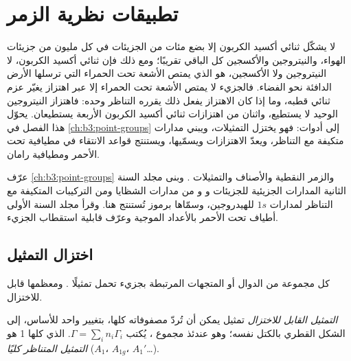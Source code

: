 \chapter{تطبيقات نظرية الزمر}\label{ch:b3:group-theory-applied}

لا يشكّل ثنائي أكسيد الكربون إلا بضع مئات من الجزيئات في كل مليون من جزيئات
الهواء، والنيتروجين والأكسجين كل الباقي تقريبًا؛ ومع ذلك فإن ثنائي أكسيد الكربون، لا
النيتروجين ولا الأكسجين، هو الذي يمتص الأشعة تحت الحمراء التي ترسلها الأرض الدافئة نحو
الفضاء. فالجزيء لا يمتص الأشعة تحت الحمراء إلا عبر اهتزاز
يغيّر عزم ثنائي قطبه، وما إذا كان الاهتزاز يفعل ذلك يقرره
التناظر وحده: فاهتزاز النيتروجين الوحيد لا يستطيع، واثنان من اهتزازات ثنائي أكسيد الكربون
الأربعة يستطيعان. يحوّل هذا الفصل  في
\cref{ch:b3:point-groups} إلى أدوات: فهو يختزل التمثيلات، ويبني
مدارات متكيفة مع التناظر، ويعدّ الاهتزازات ويسمّيها، ويستنتج
قواعد الانتقاء في مطيافية تحت الأحمر ومطيافية رامان.

\begin{recall}
عرّف \cref{ch:b3:point-groups}  والزمر النقطية
والأصناف والتمثيلات  . وبنى مجلد السنة الثانية
المدارات الجزيئية للجزيئات  و و من
مدارات الشظايا ومن التركيبات المتكيفة مع التناظر لمدارات $1s$ للهيدروجين،
وسمّاها برموز تُستنتج هنا. وقرأ مجلد السنة الأولى
أطياف تحت الأحمر بالأعداد الموجية وعرّف قابلية استقطاب
الجزيء.
\end{recall}

\section{اختزال التمثيل}

كل مجموعة من الدوال أو المتجهات المرتبطة بجزيء تحمل
تمثيلًا . ومعظمها قابل للاختزال.

\begin{definition}\label{def:b3:group-theory-applied:reducible}
\emph{التمثيل القابل للاختزال} تمثيل
يمكن أن تُردّ مصفوفاته كلها، بتغيير واحد للأساس، إلى الشكل
القطري بالكتل نفسه؛ وهو عندئذ مجموع ،
يُكتب $\Gamma = \sum_in_i\Gamma_i$.  الذي
 كلها 1 هو \emph{التمثيل المتناظر
كليًا} ($A_1$، $A_{1g}$،
$A_1'$\dots).
\end{definition}

